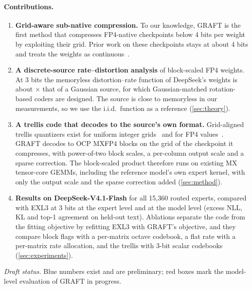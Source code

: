 \paragraph{Contributions.}
\begin{enumerate}[leftmargin=1.4em,itemsep=1pt,topsep=2pt]
\item \textbf{Grid-aware sub-native compression.} To our knowledge, GRAFT is the first method that compresses
FP4-native checkpoints below 4 bits per weight by exploiting their grid. Prior work on these checkpoints stays at about
4 bits and treats the weights as continuous~\citep{grella2026trit,requant2026}.
\item \textbf{A discrete-source rate--distortion analysis} of block-scaled FP4 weights. At 3 bits the memoryless
distortion--rate function of DeepSeek's weights is about $\times$ that of a Gaussian source, for
which Gaussian-matched rotation-based coders are designed. The source is close to memoryless in our measurements,
so we use the i.i.d.\ function as a reference (\cref{sec:theory}).
\item \textbf{A trellis code that decodes to the source's own format.} Grid-aligned trellis quantizers exist for
uniform integer grids~\citep{marcellin1990tcq,nnr2022,ccq2025} and for FP4 values~\citep{que2026xortrellis}.
GRAFT decodes to OCP MXFP4 blocks on the grid of the checkpoint it compresses, with power-of-two block scales, a
per-column output scale and a sparse correction. The block-scaled product therefore runs on
existing MX tensor-core GEMMs, including the reference model's own expert kernel, with only the output scale and the
sparse correction added (\cref{sec:method}).
\item \textbf{Results on DeepSeek-V4.1-Flash} for all 15,360 routed experts, compared with EXL3 at 3 bits at the
expert level and at the model level (excess NLL, KL and top-1 agreement on held-out text). Ablations separate the
code from the fitting objective by refitting EXL3 with GRAFT's objective, and they compare block flags with a
per-matrix octave codebook, a flat rate with a per-matrix rate allocation, and the trellis with 3-bit scalar codebooks
(\cref{sec:experiments}).
\end{enumerate}
\ifdraftmarks\noindent\textit{Draft status.} Blue numbers exist and are preliminary; red boxes mark the model-level
evaluation of GRAFT in progress.\fi
